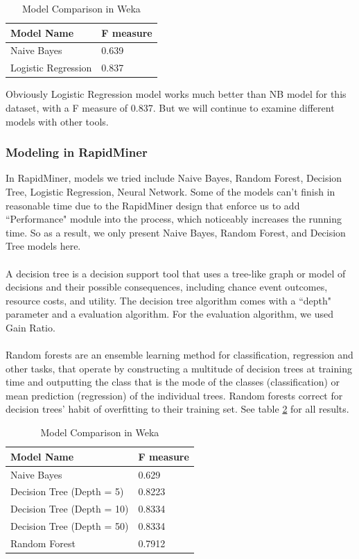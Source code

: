 \documentclass[CEJM,PDF]{cej} %
\begin{document}
\begin{table}[h]
\centering
\caption{Model Comparison in Weka}
\label{weka-model}
\begin{tabular}{@{}|l|l|@{}}
\toprule
\hline
Model Name  & F measure \\ \midrule
\hline
Naive Bayes & 0.639   \\
\hline
Logistic Regression  & 0.837 \\ \bottomrule
\hline
\end{tabular}
\end{table}

Obviously Logistic Regression model works much better than NB model for this dataset, with a F measure of 0.837. But we will continue to examine different models with other tools.\\

\subsubsection{Modeling in RapidMiner}
In RapidMiner, models we tried include Naive Bayes, Random Forest, Decision Tree, Logistic Regression, Neural Network. Some of the models can't finish in reasonable time due to the RapidMiner design that enforce us to add ``Performance" module into the process, which noticeably increases the running time. So as a result, we only present Naive Bayes, Random Forest, and Decision Tree models here. \\
\\
A decision tree is a decision support tool that uses a tree-like graph or model of decisions and their possible consequences, including chance event outcomes, resource costs, and utility. The decision tree algorithm comes with a ``depth" parameter and a evaluation algorithm. For the evaluation algorithm, we used Gain Ratio.\\
\\
Random forests are an ensemble learning method for classification, regression and other tasks, that operate by constructing a multitude of decision trees at training time and outputting the class that is the mode of the classes (classification) or mean prediction (regression) of the individual trees. Random forests correct for decision trees' habit of overfitting to their training set. See table \ref{rm-model} for all results.\\ 

\begin{table}[h]
\centering
\caption{Model Comparison in Weka}
\label{rm-model}
\begin{tabular}{@{}|l|l|@{}}
\toprule
\hline
Model Name  & F measure \\ \midrule
\hline
Naive Bayes & 0.629   \\
\hline
Decision Tree (Depth = 5) & 0.8223\\
\hline
Decision Tree (Depth = 10) & 0.8334 \\
\hline
Decision Tree (Depth = 50) & 0.8334 \\
\hline
Random Forest & 0.7912 \\ \bottomrule
\hline
\end{tabular}
\end{table}
\end{document}
